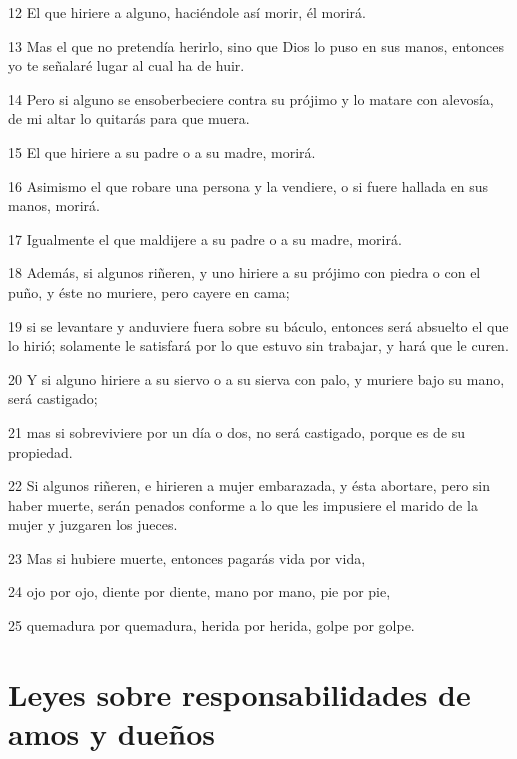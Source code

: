 \par 12 El que hiriere a alguno, haciéndole así morir, él morirá.
\par 13 Mas el que no pretendía herirlo, sino que Dios lo puso en sus manos, entonces yo te señalaré lugar al cual ha de huir.
\par 14 Pero si alguno se ensoberbeciere contra su prójimo y lo matare con alevosía, de mi altar lo quitarás para que muera.
\par 15 El que hiriere a su padre o a su madre, morirá.
\par 16 Asimismo el que robare una persona y la vendiere, o si fuere hallada en sus manos, morirá.
\par 17 Igualmente el que maldijere a su padre o a su madre, morirá.
\par 18 Además, si algunos riñeren, y uno hiriere a su prójimo con piedra o con el puño, y éste no muriere, pero cayere en cama;
\par 19 si se levantare y anduviere fuera sobre su báculo, entonces será absuelto el que lo hirió; solamente le satisfará por lo que estuvo sin trabajar, y hará que le curen.
\par 20 Y si alguno hiriere a su siervo o a su sierva con palo, y muriere bajo su mano, será castigado;
\par 21 mas si sobreviviere por un día o dos, no será castigado, porque es de su propiedad.
\par 22 Si algunos riñeren, e hirieren a mujer embarazada, y ésta abortare, pero sin haber muerte, serán penados conforme a lo que les impusiere el marido de la mujer y juzgaren los jueces.
\par 23 Mas si hubiere muerte, entonces pagarás vida por vida,
\par 24 ojo por ojo, diente por diente, mano por mano, pie por pie,
\par 25 quemadura por quemadura, herida por herida, golpe por golpe.

\section*{Leyes sobre responsabilidades de amos y dueños}

